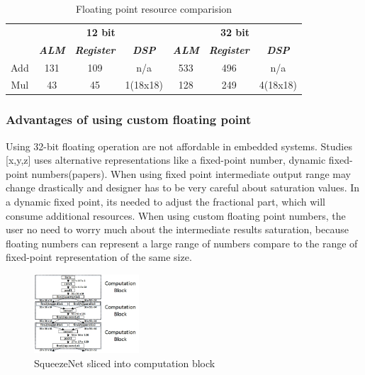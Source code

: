\documentclass[conference]{IEEEtran}
\begin{document}
\begin{table}[htbp]
\caption{Floating point resource comparision}
\begin{center}
\begin{tabular}{|c|c|c|c|c|c|c|}
\hline
				&\multicolumn{3}{|c|}{\textbf{12 bit}} 											&\multicolumn{3}{|c|}{\textbf{32 bit}}\\
				\cline{2-7} 
 				& \textbf{\textit{ALM}} & \textbf{\textit{Register}} & \textbf{\textit{DSP}}	& \textbf{\textit{ALM}}	& \textbf{\textit{Register}} & \textbf{\textit{DSP}}\\
\hline
Add 		& 131 					& 109 							& n/a 					& 533					&496						&n/a  \\
\hline
Mul	& 43 					& 45 							& 1(18x18) 					& 128					&249						&4(18x18)  \\
\hline
\end{tabular}
\label{tab1}
\end{center}
\end{table}
\subsubsection{Advantages of using custom floating point
}
Using 32-bit floating operation are not affordable in embedded systems. Studies [x,y,z] uses alternative representations like a fixed-point number, dynamic fixed-point numbers(papers). When using fixed point intermediate output range may change drastically and designer has to be very careful about saturation values. In a dynamic fixed point, its needed to adjust the fractional part, which will consume additional resources. When using custom floating point numbers, the user no need to worry much about the intermediate results saturation, because floating numbers can represent a large range of numbers compare to the range of fixed-point representation of the same size. 




\begin{figure}[htbp]
\centerline{\includegraphics[width=0.35\textwidth]{squz.jpg}}
\caption{SqueezeNet sliced into computation block}
\label{sqz}
\end{figure}
\end{document}
